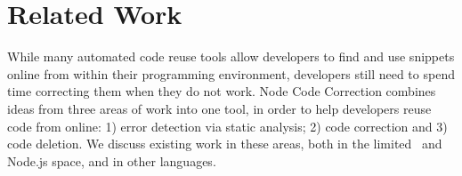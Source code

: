 \documentclass[conference]{IEEEtran}
\begin{document}


\section{Related Work}

While many automated code reuse tools allow developers to find and use snippets online from within their programming environment, developers still need to spend time correcting them when they do not work. Node Code Correction combines ideas from three areas of work into one tool, in order to help developers reuse code from online: 1) error detection via static analysis; 2) code correction and 3) code deletion. We discuss existing work in these areas, both in the limited \js\ and Node.js space, and in other languages.



\end{document}
